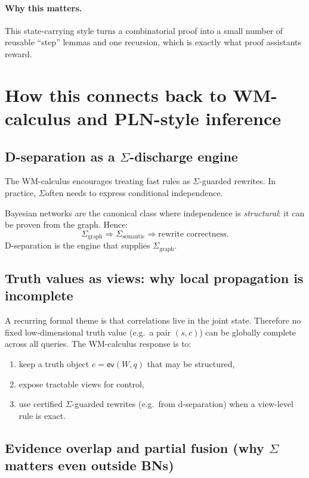 \documentclass[11pt]{article}
\newcommand{\side}{\ensuremath{\Sigma}}
\newcommand{\ev}{\mathsf{ev}}
\begin{document}
\paragraph{Why this matters.}
This state-carrying style turns a combinatorial proof into a small number of reusable ``step'' lemmas and one recursion,
which is exactly what proof assistants reward.

\section{How this connects back to WM-calculus and PLN-style inference}

\subsection{D-separation as a \texorpdfstring{$\side$}{Sigma}-discharge engine}

The WM-calculus encourages treating fast rules as \side-guarded rewrites.
In practice, \side often needs to express conditional independence.

Bayesian networks are the canonical class where independence is \emph{structural}:
it can be proven from the graph. Hence:
\[
  \side_{\text{graph}} \Rightarrow \side_{\text{semantic}} \Rightarrow \text{rewrite correctness}.
\]
D-separation is the engine that supplies $\side_{\text{graph}}$.

\subsection{Truth values as views: why local propagation is incomplete}

A recurring formal theme is that correlations live in the joint state.
Therefore no fixed low-dimensional truth value (e.g.\ a pair $(s,c)$) can be globally complete across all queries.
The WM-calculus response is to:
\begin{enumerate}[leftmargin=2em]
\item keep a truth object $e=\ev(W,q)$ that may be structured,
\item expose tractable views for control,
\item use certified \side-guarded rewrites (e.g.\ from d-separation) when a view-level rule is exact.
\end{enumerate}

\subsection{Evidence overlap and partial fusion (why \side matters even outside BNs)}
\end{document}
